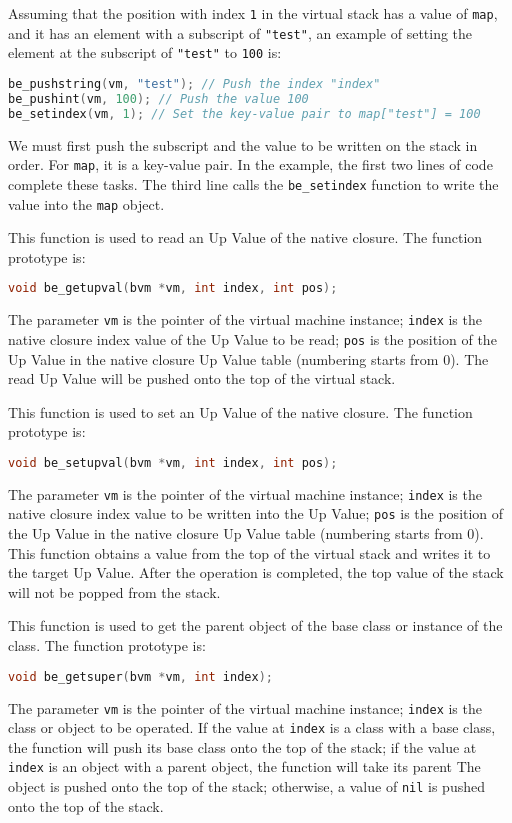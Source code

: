 Assuming that the position with index \texttt{1} in the virtual stack has a value of \texttt{map}, and it has an element with a subscript of \texttt{"test"}, an example of setting the element at the subscript of \texttt{"test"} to \texttt{100} is:
\begin{lstlisting}[language=c, style=berry]
be_pushstring(vm, "test"); // Push the index "index"
be_pushint(vm, 100); // Push the value 100
be_setindex(vm, 1); // Set the key-value pair to map["test"] = 100
\end{lstlisting}
We must first push the subscript and the value to be written on the stack in order. For \texttt{map}, it is a key-value pair. In the example, the first two lines of code complete these tasks. The third line calls the \texttt{be\_setindex} function to write the value into the \texttt{map} object.


This function is used to read an Up Value of the native closure. The function prototype is:
\begin{lstlisting}[language=c, style=berry, numbers=none]
void be_getupval(bvm *vm, int index, int pos);
\end{lstlisting}
The parameter \texttt{vm} is the pointer of the virtual machine instance; \texttt{index} is the native closure index value of the Up Value to be read; \texttt{pos} is the position of the Up Value in the native closure Up Value table (numbering starts from 0). The read Up Value will be pushed onto the top of the virtual stack.


This function is used to set an Up Value of the native closure. The function prototype is:
\begin{lstlisting}[language=c, style=berry, numbers=none]
void be_setupval(bvm *vm, int index, int pos);
\end{lstlisting}
The parameter \texttt{vm} is the pointer of the virtual machine instance; \texttt{index} is the native closure index value to be written into the Up Value; \texttt{pos} is the position of the Up Value in the native closure Up Value table (numbering starts from 0). This function obtains a value from the top of the virtual stack and writes it to the target Up Value. After the operation is completed, the top value of the stack will not be popped from the stack.


This function is used to get the parent object of the base class or instance of the class. The function prototype is:
\begin{lstlisting}[language=c, style=berry, numbers=none]
void be_getsuper(bvm *vm, int index);
\end{lstlisting}
The parameter \texttt{vm} is the pointer of the virtual machine instance; \texttt{index} is the class or object to be operated. If the value at \texttt{index} is a class with a base class, the function will push its base class onto the top of the stack; if the value at \texttt{index} is an object with a parent object, the function will take its parent The object is pushed onto the top of the stack; otherwise, a value of \texttt{nil} is pushed onto the top of the stack.

